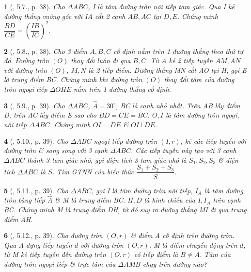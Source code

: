 \documentclass{article}
\newtheorem{baitoan}{}
\begin{document}
\begin{baitoan}[\cite{TLCT_THCS_Toan_9_hinh_hoc}, 5.7., p. 38]
	Cho $\Delta ABC$, I là tâm đường tròn nội tiếp tam giác. Qua I kẻ đường thẳng vuông góc với IA cắt 2 cạnh $AB,AC$ tại $D,E$. Chứng minh $\dfrac{BD}{CE} = \left(\dfrac{IB}{IC}\right)^2$.
\end{baitoan}

\begin{baitoan}[\cite{TLCT_THCS_Toan_9_hinh_hoc}, 5.8., p. 38]
	Cho 3 điểm $A,B,C$ cố định nằm trên 1 đường thẳng theo thứ tự đó. Đường tròn $(O)$ thay đổi luôn đi qua $B,C$. Từ A kẻ 2 tiếp tuyến $AM,AN$ với đường tròn $(O)$, $M,N$ là 2 tiếp điểm. Đường thẳng MN cắt AO tại H, gọi E là trung điểm BC. Chứng minh khi đường tròn $(O)$ thay đổi tâm của đường tròn ngoại tiếp $\Delta OHE$ nằm trên 1 đường thẳng cố định.
\end{baitoan}

\begin{baitoan}[\cite{TLCT_THCS_Toan_9_hinh_hoc}, 5.9., p. 39]
	Cho $\Delta ABC$, $\widehat{A} = 30^\circ$, BC là cạnh nhỏ nhất. Trên AB lấy điểm D, trên AC lấy điểm E sao cho $BD = CE = BC$. $O,I$ là tâm đường tròn ngoại, nội tiếp $\Delta ABC$. Chứng minh $OI = DE$ \& $OI\bot DE$.
\end{baitoan}

\begin{baitoan}[\cite{TLCT_THCS_Toan_9_hinh_hoc}, 5.10., p. 39]
	Cho $\Delta ABC$ ngoại tiếp đường tròn $(I,r)$, kẻ các tiếp tuyến với đường tròn \& song song với 3 cạnh $\Delta ABC$. Các tiếp tuyến này tạo với 3 cạnh $\Delta ABC$ thành 3 tam giác nhỏ, gọi diện tích 3 tam giác nhỏ là $S_1,S_2,S_3$ \& diện tích $\Delta ABC$ là $S$. Tìm {\rm GTNN} của biểu thức $\dfrac{S_1 + S_2 + S_3}{S}$.
\end{baitoan}

\begin{baitoan}[\cite{TLCT_THCS_Toan_9_hinh_hoc}, 5.11., p. 39]
	Cho $\Delta ABC$, gọi I là tâm đường tròn nội tiếp, $I_A$ là tâm đường tròn bàng tiếp $\widehat{A}$ \& M là trung điểm BC. $H,D$ là hình chiếu của $I,I_A$ trên cạnh BC. Chứng minh M là trung điểm DH, từ đó suy ra đường thẳng MI đi qua trung điểm AH.
\end{baitoan}

\begin{baitoan}[\cite{TLCT_THCS_Toan_9_hinh_hoc}, 5.12., p. 39]
	Cho đường tròn $(O,r)$ \& điểm A cố định trên đường tròn. Qua A dựng tiếp tuyến $d$ với đường tròn $(O,r)$. M là điểm chuyển động trên $d$, từ M kẻ tiếp tuyến đến đường tròn $(O,r)$ có tiếp điểm là $B\ne A$. Tâm của đường tròn ngoại tiếp \& trực tâm của $\Delta AMB$ chạy trên đường nào?
\end{baitoan}
\end{document}
